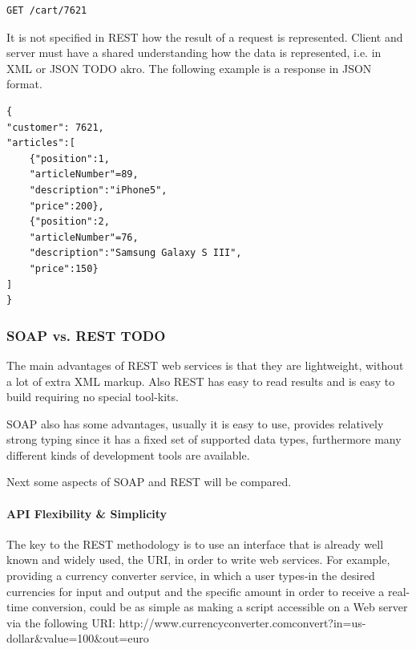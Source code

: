 \begin{lstlisting}
GET /cart/7621
\end{lstlisting}

It is not specified in REST how the result of a request is represented. Client and server must have a shared understanding how the data is represented, i.e. in XML or JSON TODO akro. The following example is a response in JSON format.

\begin{lstlisting}
{
"customer": 7621,
"articles":[
	{"position":1,
	"articleNumber"=89,
	"description":"iPhone5",
	"price":200},
	{"position":2,
	"articleNumber"=76,
	"description":"Samsung Galaxy S III",
	"price":150}
]
}
\end{lstlisting}

\subsubsection{SOAP vs. REST TODO\label{sec:back_tech_ws_rest}}

The main advantages of REST web services is that they are lightweight, without a lot of extra XML markup. Also REST has easy to read results and is easy to build requiring no special tool-kits.

SOAP also has some advantages, usually it is easy to use, provides relatively strong typing since it has a fixed set of supported data types, furthermore many different kinds of development tools are available.

Next some aspects of SOAP and REST will be compared.

\paragraph{API Flexibility \& Simplicity}

The key to the REST methodology is to use an interface that is already well known and widely used, the URI, in order to write web services. For example, providing a currency converter service, in which a user types-in the desired currencies for input and output and the specific amount in order to receive a real-time conversion, could be as simple as making a script accessible on a Web server via the following URI: http://www.currencyconverter.com\/convert?in=us-dollar\&value=100\&out=euro

